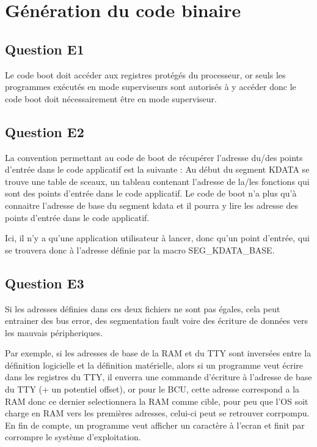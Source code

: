 \documentclass{article}
\begin{document}
\section{Génération du code binaire}

\subsection{Question E1}

Le code boot doit accéder aux registres protégés du processeur, or seuls
les programmes exécutés en mode superviseurs sont autorisés à y accéder
donc le code boot doit nécessairement être en mode superviseur.



\subsection{Question E2}

La convention permettant au code de boot de récupérer l'adresse du/des points
d'entrée dans le code applicatif est la suivante :
Au début du segment KDATA se trouve une table de sceaux, un tableau contenant
l'adresse de la/les fonctions qui sont des points d'entrée dans le code
applicatif.
Le code de boot n'a plus qu'à connaitre l'adresse de base du segment kdata
et il pourra y lire les adresse des points d'entrée dans le code applicatif.

Ici, il n'y a qu'une application utilisateur à lancer, donc qu'un point
d'entrée, qui se trouvera donc à l'adresse définie par la macro SEG\_KDATA\_BASE.



\subsection{Question E3}

Si les adresses définies dans ces deux fichiers ne sont pas égales, cela peut
entrainer des bus error, des segmentation fault voire des écriture de données
vers les mauvais péripheriques.

Par exemple, si les adresses de base de la RAM et du TTY sont inversées
entre la définition logicielle et la définition matérielle, alors si un
programme veut écrire dans les registres du TTY, il enverra une commande
d'écriture à l'adresse de base du TTY (+ un potentiel offset), or pour le BCU,
cette adresse correspond a la RAM donc ce dernier selectionnera la RAM comme
cible, pour peu que l'OS soit charge en RAM vers les premières adresses,
celui-ci peut se retrouver corrpompu.
En fin de compte, un programme veut afficher un caractère à l'ecran et finit
par corrompre le système d'exploitation. 
\end{document}
